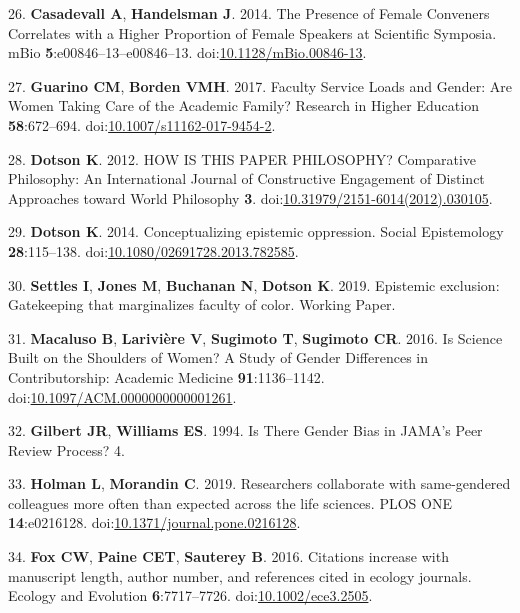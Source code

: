 \documentclass[11pt,]{article}
\begin{document}
\hypertarget{ref-casadevall_presence_2014}{}
26. \textbf{Casadevall A}, \textbf{Handelsman J}. 2014. The Presence of
Female Conveners Correlates with a Higher Proportion of Female Speakers
at Scientific Symposia. mBio \textbf{5}:e00846--13--e00846--13.
doi:\href{https://doi.org/10.1128/mBio.00846-13}{10.1128/mBio.00846-13}.

\hypertarget{ref-guarino_faculty_2017}{}
27. \textbf{Guarino CM}, \textbf{Borden VMH}. 2017. Faculty Service
Loads and Gender: Are Women Taking Care of the Academic Family? Research
in Higher Education \textbf{58}:672--694.
doi:\href{https://doi.org/10.1007/s11162-017-9454-2}{10.1007/s11162-017-9454-2}.

\hypertarget{ref-Dotson2012}{}
28. \textbf{Dotson K}. 2012. HOW IS THIS PAPER PHILOSOPHY? Comparative
Philosophy: An International Journal of Constructive Engagement of
Distinct Approaches toward World Philosophy \textbf{3}.
doi:\href{https://doi.org/10.31979/2151-6014(2012).030105}{10.31979/2151-6014(2012).030105}.

\hypertarget{ref-Dotson2014}{}
29. \textbf{Dotson K}. 2014. Conceptualizing epistemic oppression.
Social Epistemology \textbf{28}:115--138.
doi:\href{https://doi.org/10.1080/02691728.2013.782585}{10.1080/02691728.2013.782585}.

\hypertarget{ref-settles_epistemic_2019}{}
30. \textbf{Settles I}, \textbf{Jones M}, \textbf{Buchanan N},
\textbf{Dotson K}. 2019. Epistemic exclusion: Gatekeeping that
marginalizes faculty of color. Working Paper.

\hypertarget{ref-macaluso_is_2016}{}
31. \textbf{Macaluso B}, \textbf{Larivière V}, \textbf{Sugimoto T},
\textbf{Sugimoto CR}. 2016. Is Science Built on the Shoulders of Women?
A Study of Gender Differences in Contributorship: Academic Medicine
\textbf{91}:1136--1142.
doi:\href{https://doi.org/10.1097/ACM.0000000000001261}{10.1097/ACM.0000000000001261}.

\hypertarget{ref-gilbert_is_1994}{}
32. \textbf{Gilbert JR}, \textbf{Williams ES}. 1994. Is There Gender
Bias in JAMA's Peer Review Process? 4.

\hypertarget{ref-holman_researchers_2019}{}
33. \textbf{Holman L}, \textbf{Morandin C}. 2019. Researchers
collaborate with same-gendered colleagues more often than expected
across the life sciences. PLOS ONE \textbf{14}:e0216128.
doi:\href{https://doi.org/10.1371/journal.pone.0216128}{10.1371/journal.pone.0216128}.

\hypertarget{ref-fox_citations_2016}{}
34. \textbf{Fox CW}, \textbf{Paine CET}, \textbf{Sauterey B}. 2016.
Citations increase with manuscript length, author number, and references
cited in ecology journals. Ecology and Evolution \textbf{6}:7717--7726.
doi:\href{https://doi.org/10.1002/ece3.2505}{10.1002/ece3.2505}.
\end{document}
